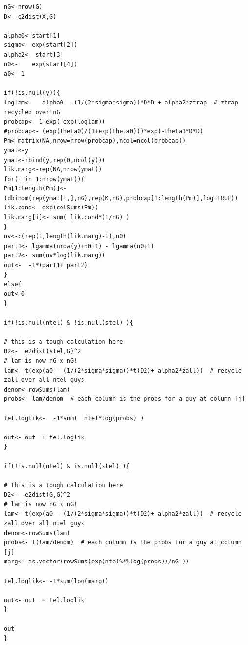 \documentclass[12pt]{article}
\begin{document}
{\begin{verbatim}
nG<-nrow(G)
D<- e2dist(X,G)

alpha0<-start[1]
sigma<- exp(start[2])
alpha2<- start[3]
n0<-    exp(start[4])
a0<- 1

if(!is.null(y)){
loglam<-   alpha0  -(1/(2*sigma*sigma))*D*D + alpha2*ztrap  # ztrap recycled over nG
probcap<- 1-exp(-exp(loglam))
#probcap<- (exp(theta0)/(1+exp(theta0)))*exp(-theta1*D*D)
Pm<-matrix(NA,nrow=nrow(probcap),ncol=ncol(probcap))
ymat<-y
ymat<-rbind(y,rep(0,ncol(y)))
lik.marg<-rep(NA,nrow(ymat))
for(i in 1:nrow(ymat)){
Pm[1:length(Pm)]<- (dbinom(rep(ymat[i,],nG),rep(K,nG),probcap[1:length(Pm)],log=TRUE))
lik.cond<- exp(colSums(Pm))
lik.marg[i]<- sum( lik.cond*(1/nG) )
}
nv<-c(rep(1,length(lik.marg)-1),n0)
part1<- lgamma(nrow(y)+n0+1) - lgamma(n0+1)
part2<- sum(nv*log(lik.marg))
out<-  -1*(part1+ part2)
}
else{
out<-0
}

if(!is.null(ntel) & !is.null(stel) ){

# this is a tough calculation here
D2<-  e2dist(stel,G)^2
# lam is now nG x nG!
lam<- t(exp(a0 - (1/(2*sigma*sigma))*t(D2)+ alpha2*zall))  # recycle zall over all ntel guys
denom<-rowSums(lam)
probs<- lam/denom  # each column is the probs for a guy at column [j]

tel.loglik<-  -1*sum(  ntel*log(probs) )

out<- out  + tel.loglik
}

if(!is.null(ntel) & is.null(stel) ){

# this is a tough calculation here
D2<-  e2dist(G,G)^2
# lam is now nG x nG!
lam<- t(exp(a0 - (1/(2*sigma*sigma))*t(D2)+ alpha2*zall))  # recycle zall over all ntel guys
denom<-rowSums(lam)
probs<- t(lam/denom)  # each column is the probs for a guy at column [j]
marg<- as.vector(rowSums(exp(ntel%*%log(probs))/nG ))

tel.loglik<- -1*sum(log(marg))

out<- out  + tel.loglik
}

out
}

\end{verbatim}
}





\clearpage
\newpage
\end{document}
